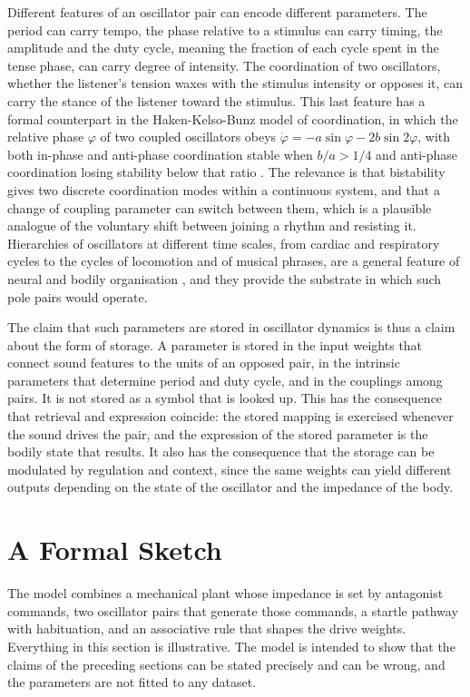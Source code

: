 \documentclass[11pt]{article}
\theoremstyle{plain}
\theoremstyle{definition}
\begin{document}
Different features of an oscillator pair can encode different parameters. The period can carry tempo, the phase relative to a stimulus can carry timing, the amplitude and the duty cycle, meaning the fraction of each cycle spent in the tense phase, can carry degree of intensity. The coordination of two oscillators, whether the listener's tension waxes with the stimulus intensity or opposes it, can carry the stance of the listener toward the stimulus. This last feature has a formal counterpart in the Haken-Kelso-Bunz model of coordination, in which the relative phase $\varphi$ of two coupled oscillators obeys $\dot\varphi = -a\sin\varphi - 2b\sin 2\varphi$, with both in-phase and anti-phase coordination stable when $b/a>1/4$ and anti-phase coordination losing stability below that ratio \citep{haken1985,kelso1995}. The relevance is that bistability gives two discrete coordination modes within a continuous system, and that a change of coupling parameter can switch between them, which is a plausible analogue of the voluntary shift between joining a rhythm and resisting it. Hierarchies of oscillators at different time scales, from cardiac and respiratory cycles to the cycles of locomotion and of musical phrases, are a general feature of neural and bodily organisation \citep{buzsaki2006}, and they provide the substrate in which such pole pairs would operate.

The claim that such parameters are stored in oscillator dynamics is thus a claim about the form of storage. A parameter is stored in the input weights that connect sound features to the units of an opposed pair, in the intrinsic parameters that determine period and duty cycle, and in the couplings among pairs. It is not stored as a symbol that is looked up. This has the consequence that retrieval and expression coincide: the stored mapping is exercised whenever the sound drives the pair, and the expression of the stored parameter is the bodily state that results. It also has the consequence that the storage can be modulated by regulation and context, since the same weights can yield different outputs depending on the state of the oscillator and the impedance of the body.

\section{A Formal Sketch}\label{sec:formal}

The model combines a mechanical plant whose impedance is set by antagonist commands, two oscillator pairs that generate those commands, a startle pathway with habituation, and an associative rule that shapes the drive weights. Everything in this section is illustrative. The model is intended to show that the claims of the preceding sections can be stated precisely and can be wrong, and the parameters are not fitted to any dataset.
\end{document}
